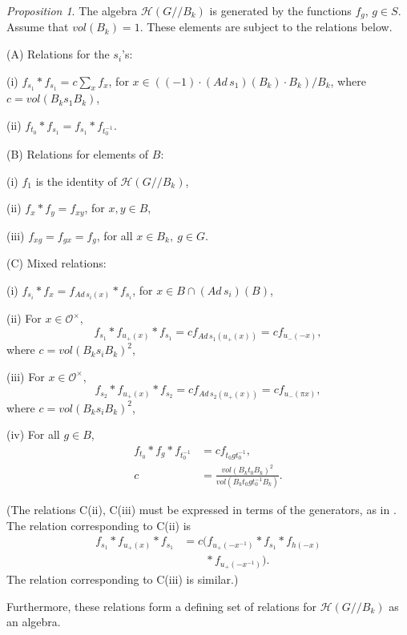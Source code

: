 \documentclass[12pt,letterpaper]{amsart}
\theoremstyle{definition}
\theoremstyle{remark}
\newtheorem{proposition}[theorem]{Proposition}
\begin{document}
\begin{proposition} 
\label{prop:main}
The algebra $\mathcal{H}(G//B_k)$
is generated by the functions $f_g$, $g\in S$.
Assume that $vol(B_k)=1$.
These elements are subject to the relations below.

\noindent
(A) Relations for the $s_i$'s:

(i) $f_{s_1}*f_{s_1}=c\sum_x f_x$, for
$x\in ((-1)\cdot (Ad\, s_1)(B_k)\cdot B_k)/B_k$, where
$c=vol(B_k s_1 B_k)$, 

(ii) $f_{t_0}*f_{s_1}=f_{s_1}*f_{t_0^{-1}}$.

\noindent
(B) Relations for elements of $B$:

(i) $f_1$ is the identity of $\mathcal{H}(G//B_k)$,

(ii) $f_x*f_y=f_{xy}$, for $x,y\in B$,

(iii) $f_{xg}=f_{gx}=f_g$, for all $x\in B_k,\ g\in G$.

\noindent
(C) Mixed relations:

(i) $f_{s_i}*f_x=f_{Ad\, s_i(x)}*f_{s_i}$, for $x\in B\cap (Ad\, s_i)(B)$,

(ii) For $x\in \mathcal{O}^\times$,
\[
f_{s_1}*f_{u_+(x)}*f_{s_1}
=cf_{Ad\, s_1(u_+(x))}=cf_{u_-(-x)},
\]
where $c=vol(B_k s_i B_k)^2$,

(iii) For $x\in \mathcal{O}^\times$,
\[
f_{s_2}*f_{u_+(x)}*f_{s_2}
=cf_{Ad\, s_2(u_+(x))}=cf_{u_-(\pi x)},
\]
where $c=vol(B_k s_i B_k)^2$,

(iv) For all $g\in B$,
\[
\begin{aligned}
f_{t_0}*f_g*f_{t_0^{-1}}&=cf_{t_0gt_0^{-1}},\\
c&=\frac{vol(B_k t_0 B_k)^2}{vol(B_k t_0gt_0^{-1}B_k)}.
\end{aligned}
\]

\noindent
(The relations C(ii), C(iii) must be expressed in terms of the generators,
as in \cite{H}. The relation corresponding to C(ii) is
\[
\begin{aligned}
f_{s_1}*f_{u_+(x)}*f_{s_1}
&=c\bigl(f_{u_+(-x^{-1})}*f_{s_1}*f_{h(-x)}\\
&\qquad *f_{u_+(-x^{-1})}\bigr).
\end{aligned}
\]
The relation corresponding to C(iii) is similar.)

Furthermore, these relations form a defining set of relations for
$\mathcal{H}(G//B_k)$ as an algebra.
\end{proposition}
\end{document}
